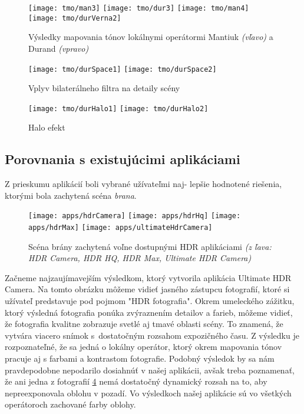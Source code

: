 \documentclass[slovak]{ExcelAtFIT}
\begin{document}
\begin{figure}[t]
  \centering
	\texttt{[image: tmo/man3]}
	\texttt{[image: tmo/dur3]}
	\texttt{[image: tmo/man4]}
	\texttt{[image: tmo/durVerna2]}
  \caption{Výsledky mapovania tónov lokálnymi operátormi Mantiuk \textit{(vľavo)} a Durand \textit{(vpravo)}}
  \label{fig:LocalTMOs}
\end{figure}

\begin{figure}[t]
  \centering
	\texttt{[image: tmo/durSpace1]}
	\texttt{[image: tmo/durSpace2]}
  \caption{Vplyv bilaterálneho filtra na detaily scény}
  \label{fig:DurandUsage}
\end{figure}

\begin{figure}[t]
  \centering
	\texttt{[image: tmo/durHalo1]}
	\texttt{[image: tmo/durHalo2]}
  \caption{Halo efekt}
  \label{fig:DurandHalo}
\end{figure}

\subsection{Porovnania s existujúcimi aplikáciami}
\label{sec:Result-Apps}

Z prieskumu aplikácií boli vybrané užívateľmi naj- lepšie hodnotené riešenia, ktorými bola zachytená scéna \textit{brana}.

\begin{figure}[t]
  \centering
	\texttt{[image: apps/hdrCamera]}
	\texttt{[image: apps/hdrHq]}
	\texttt{[image: apps/hdrMax]}
	\texttt{[image: apps/ultimateHdrCamera]}
  \caption{Scéna brány zachytená voľne dostupnými HDR aplikáciami \textit{(z ľava: HDR Camera, HDR HQ, HDR Max, Ultimate HDR Camera)}}
  \label{fig:Apps}
\end{figure}

Začneme najzaujímavejším výsledkom, ktorý vytvorila aplikácia Ultimate HDR Camera.
Na tomto obrázku môžeme vidieť jasného zástupcu fotografií, ktoré si užívateľ predstavuje pod pojmom
"HDR fotografia". Okrem umeleckého zážitku, ktorý výsledná fotografia ponúka zvýraznením detailov
a farieb, môžeme vidieť, že fotografia kvalitne zobrazuje svetlé aj tmavé oblasti scény. To znamená,
že vytvára viacero snímok s~dostatočným rozsahom expozičného času. Z výsledku je rozpoznateľné, že sa jedná
o lokálny operátor, ktorý okrem mapovania tónov pracuje aj s farbami a kontrastom fotografie. Podobný
výsledok by sa nám pravdepodobne nepodarilo dosiahnúť v našej aplikácii, avšak treba poznamenať,
že ani jedna z fotografií \ref{fig:Apps} nemá dostatočný dynamický rozsah na to, aby nepreexponovala
oblohu v pozadí. Vo výsledkoch našej aplikácie sú vo všetkých operátoroch zachované farby oblohy.
\end{document}
